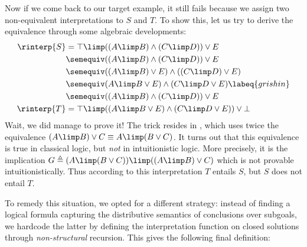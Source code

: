 Now if we come back to our target example, it still fails because we assign two
non-equivalent interpretations to $S$ and $T$. To show this, let us try to
derive the equivalence through some algebraic developments:
\begin{align}
  \rinterp{S} &= \top \limp ((A \limp B) \land (C \limp D)) \lor E \nonumber\\
              &\semequiv ((A \limp B) \land (C \limp D)) \lor E \\
              &\semequiv ((A \limp B) \lor E) \land ((C \limp D) \lor E) \\
              &\semequiv (A \limp B \lor E) \land (C \limp D \lor E) \labeq{grishin}\\
              &\semequiv ((A \limp B) \land (C \limp D)) \lor E \\
  \rinterp{T} &= \top \limp ((A \limp B \lor E) \land (C \limp D \lor E)) \lor \bot \nonumber
\end{align}
Wait, we did manage to prove it! The trick resides in , which
uses twice the equivalence $(A \limp B) \lor C \equiv A \limp (B \lor C)$. It
turns out that this equivalence is true in classical logic, but \emph{not} in
intuitionistic logic. More precisely, it is the implication $G \triangleq (A
\limp (B \lor C)) \limp ((A \limp B) \lor C)$ which is not provable
intuitionistically. Thus according to this interpretation $T$
entails $S$, but $S$ does not entail $T$.

To remedy this situation, we opted for a different strategy: instead of finding
a logical formula capturing the distributive semantics of conclusions over
subgoals, we hardcode the latter by defining the interpretation function on
closed solutions through \emph{non-structural} recursion. This gives the
following final definition:

